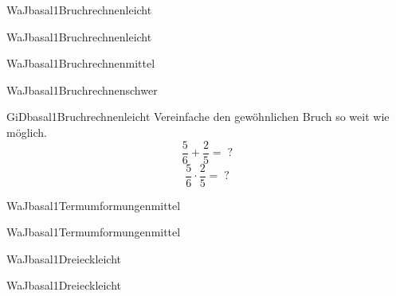 \documentclass[12pt]{article}
\begin{document}
\begin{Add}{WaJ}{basal1}{Bruchrechnen}{leicht}
\end{Add}

\begin{Add}{WaJ}{basal1}{Bruchrechnen}{leicht}
\end{Add}

\begin{Add}{WaJ}{basal1}{Bruchrechnen}{mittel}
\end{Add}

\begin{Add}{WaJ}{basal1}{Bruchrechnen}{schwer}
\end{Add}

\begin{Add}{GiD}{basal1}{Bruchrechnen}{leicht}
    \question
    {Vereinfache den gewöhnlichen Bruch so weit wie möglich.
        $$\frac{5}{6}+\frac{2}{5}=\;?$$
        $$\frac{5}{6}\cdot\frac{2}{5}=\;?$$
    }
\end{Add}

\begin{Add}{WaJ}{basal1}{Termumformungen}{mittel}
\end{Add}

\begin{Add}{WaJ}{basal1}{Termumformungen}{mittel}
\end{Add}

\begin{Add}{WaJ}{basal1}{Dreieck}{leicht}
\end{Add}

\begin{Add}{WaJ}{basal1}{Dreieck}{leicht}
\end{Add}
\end{document}
